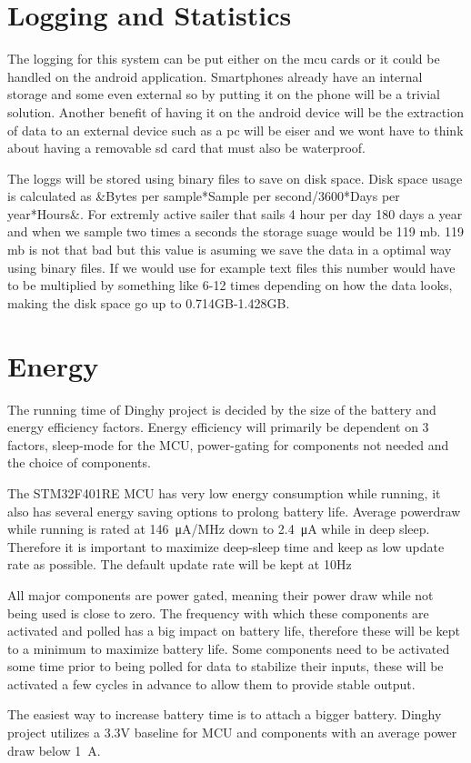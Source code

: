 ﻿\documentclass{article}
\begin{document}
\section{Logging and Statistics}
The logging for this system can be put either on the mcu cards or it could be handled on the android application. Smartphones already have an internal storage and some even external so by putting it on the phone will be a trivial solution. Another benefit of having it on the android device will be the extraction of data to an external device such as a pc will be eiser and we wont have to think about having a removable sd card that must also be waterproof.

The loggs will be stored using binary files to save on disk space. Disk space usage is calculated as &Bytes per sample*Sample per second/3600*Days per year*Hours&. For extremly active sailer that sails 4 hour per day 180 days a year and when we sample two times a seconds the storage suage would be 119 mb. 119 mb is not that bad but this value is asuming we save the data in a optimal way using binary files. If we would use for example text files this number would have to be multiplied by something like 6-12 times depending on how the data looks, making the disk space go up to 0.714GB-1.428GB.  


\section{Energy}
The running time of Dinghy project is decided by the size of the battery and energy efficiency factors. Energy efficiency will primarily be dependent on 3 factors, sleep-mode for the MCU, power-gating for components not needed and the choice of components.

The STM32F401RE MCU has very low energy consumption while running, it also has several energy saving options to prolong battery life. Average powerdraw while running is rated at \SI{146}{\micro\ampere}/MHz down to \SI{2.4}{\micro\ampere} while in deep sleep. Therefore it is important to maximize deep-sleep time and keep as low update rate as possible. The default update rate will be kept at 10Hz

All major components are power gated, meaning their power draw while not being used is close to zero. The frequency with which these components are activated and polled has a big impact on battery life, therefore these will be kept to a minimum to maximize battery life. Some components need to be activated some time prior to being polled for data to stabilize their inputs, these will be activated a few cycles in advance to allow them to provide stable output.

The easiest way to increase battery time is to attach a bigger battery. Dinghy project utilizes a 3.3V baseline for MCU and components with an average power draw below \SI{1}{\ampere}.
\end{document}
